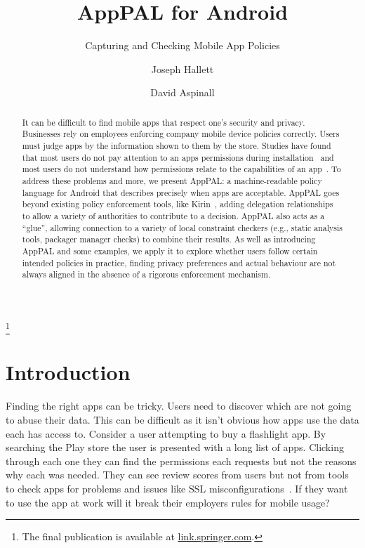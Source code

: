 \documentclass[]{llncs}
\title{AppPAL for Android}
\subtitle{Capturing and Checking Mobile App Policies}
\author{Joseph Hallett \and David Aspinall }
\institute{School of Informatics, University of Edinburgh}
\newcommand\blfootnote[1]{%
  \begingroup
  \renewcommand\thefootnote{}\footnote{#1}%
  \addtocounter{footnote}{-1}%
  \endgroup
}
\begin{document}
\maketitle{}

\begin{abstract}
  It can be difficult to find mobile apps that respect one's security and privacy.
  Businesses rely on employees enforcing company mobile device policies correctly.
  Users must judge apps by the information shown to them by the store.
  Studies have found that most users do not pay attention to an apps permissions during installation~\cite{Felt:2012hm} and most users do not understand how permissions relate to the capabilities of an app~\cite{Kelley:2012bw}.
  To address these problems and more, we present AppPAL: a machine-readable policy language for Android that describes precisely when apps are acceptable.
  AppPAL goes beyond existing policy enforcement tools, like Kirin~\cite{Enck:2009ko}, adding delegation relationships to allow a variety of authorities to contribute to a decision.
  AppPAL also acts as a ``glue'', allowing connection to a variety of local constraint checkers (e.g., static analysis tools, packager manager checks) to combine their results.
  As well as introducing AppPAL and some examples, we apply it to explore whether users follow certain intended policies in practice, finding privacy preferences and actual behaviour are not always aligned in the absence of a rigorous enforcement mechanism.
\end{abstract}
\blfootnote{The final publication is available at \url{link.springer.com}.}

\section{Introduction}
\label{sec:introduction}

Finding the right apps can be tricky.
Users need to discover which are not going to abuse their data.
This can be difficult as it isn't obvious how apps use the data each has access to.
Consider a user attempting to buy a flashlight app.
By searching the Play store the user is presented with a long list of apps.
Clicking through each one they can find the permissions each requests but not the reasons why each was needed.
They can see review scores from users but not from tools to check apps for problems and issues like SSL misconfigurations~\cite{Fahl:2012dj}.
If they want to use the app at work will it break their employers rules for mobile usage?
\end{document}
